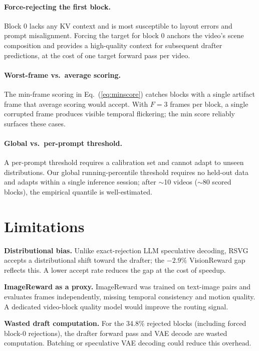 \documentclass{article}
\begin{document}
\paragraph{Force-rejecting the first block.}
Block 0 lacks any KV context and is most susceptible to layout errors and
prompt misalignment.
Forcing the target for block 0 anchors the video's scene composition and
provides a high-quality context for subsequent drafter predictions,
at the cost of one target forward pass per video.

\paragraph{Worst-frame vs.\ average scoring.}
The min-frame scoring in Eq.~(\ref{eq:minscore}) catches blocks with a
single artifact frame that average scoring would accept.
With $F{=}3$ frames per block, a single corrupted frame produces
visible temporal flickering; the min score reliably surfaces these cases.

\paragraph{Global vs.\ per-prompt threshold.}
A per-prompt threshold requires a calibration set and cannot adapt to
unseen distributions.
Our global running-percentile threshold requires no held-out data and
adapts within a single inference session; after $\sim$10 videos ($\sim$80
scored blocks), the empirical quantile is well-estimated.

\section{Limitations}

\textbf{Distributional bias.}
Unlike exact-rejection LLM speculative decoding, RSVG accepts a
distributional shift toward the drafter; the $-2.9\%$ VisionReward gap
reflects this.
A lower accept rate reduces the gap at the cost of speedup.

\textbf{ImageReward as a proxy.}
ImageReward was trained on text-image pairs and evaluates frames
independently, missing temporal consistency and motion quality.
A dedicated video-block quality model would improve the routing signal.

\textbf{Wasted draft computation.}
For the 34.8\% rejected blocks (including forced block-0 rejections),
the drafter forward pass and VAE decode are wasted computation.
Batching or speculative VAE decoding could reduce this overhead.
\end{document}
